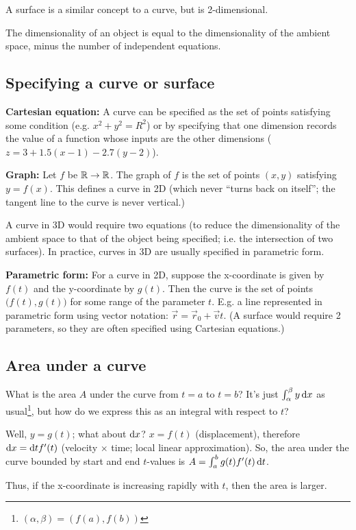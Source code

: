 A surface is a similar concept to a curve, but is 2-dimensional.

The dimensionality of an object is equal to the dimensionality of the ambient
space, minus the number of independent equations.

\subsection{Specifying a curve or surface}

\textbf{Cartesian equation:} A curve can be specified as the set of points
satisfying some condition (e.g. $x^2 + y^2 = R^2$) or by specifying that one
dimension records the value of a function whose inputs are the other
dimensions ($z = 3 + 1.5(x-1) - 2.7(y-2)$).

\textbf{Graph:} Let $f$ be $\mathbb{R} \to \mathbb{R}$. The graph of $f$ is the set of points
$(x,y)$ satisfying $y = f(x)$. This defines a curve in 2D (which never ``turns
back on itself''; the tangent line to the curve is never vertical.)

A curve in 3D would require two equations (to reduce the dimensionality of the
ambient space to that of the object being specified; i.e. the intersection of
two surfaces). In practice, curves in 3D are usually specified in parametric
form.

\textbf{Parametric form:} For a curve in 2D, suppose the x-coordinate is given
by $f(t)$ and the y-coordinate by $g(t)$. Then the curve is the set of points
$\big(f(t), g(t)\big)$ for some range of the parameter $t$. E.g. a line
represented in parametric form using vector notation:
$\vec r = \vec r_0 + \vec v t$. (A surface would require 2 parameters, so they
are often specified using Cartesian equations.)


\subsection{Area under a curve}

What is the area $A$ under the curve from $t=a$ to $t=b$? It's just
$\int_\alpha^\beta y \dx$ as usual\footnote{$(\alpha, \beta) = (f(a), f(b))$},
but how do we express this as an integral with respect to $t$?

Well, $y = g(t)$; what about $\dx$? $x = f(t)$ (displacement), therefore
$\dx = \dt f'(t)$ (velocity $\times$ time; local linear approximation). So, the
area under the curve bounded by start and end $t$-values is
$A = \int_a^b g(t) f'(t) \dt$.

Thus, if the x-coordinate is increasing rapidly with $t$, then the area is
larger.

